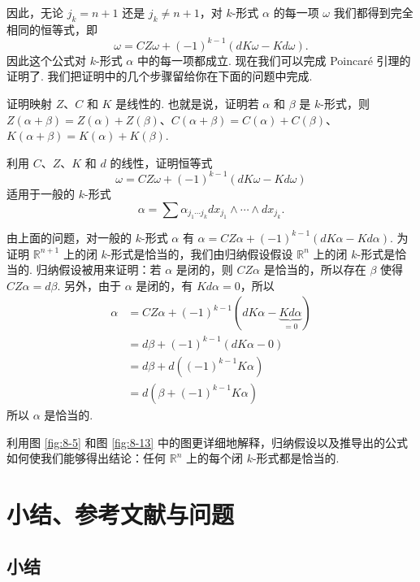 因此，无论 $j_k=n+1$ 还是 $j_k\neq n+1$，对 $k$-形式 $\alpha$ 的每一项 $\omega$ 我们都得到完全相同的恒等式，即
\[
\omega=CZ\omega+(-1)^{k-1}\left(dK\omega-Kd\omega\right).
\]
因此这个公式对 $k$-形式 $\alpha$ 中的每一项都成立. 现在我们可以完成 Poincaré 引理的证明了. 我们把证明中的几个步骤留给你在下面的问题中完成.

\begin{question}\label{q:8-8}
证明映射 $Z$、$C$ 和 $K$ 是线性的. 也就是说，证明若 $\alpha$ 和 $\beta$ 是 $k$-形式，则 $Z(\alpha+\beta)=Z(\alpha)+Z(\beta)$、$C(\alpha+\beta)=C(\alpha)+C(\beta)$、$K(\alpha+\beta)=K(\alpha)+K(\beta)$.
\end{question}

\begin{question}\label{q:8-9}
利用 $C$、$Z$、$K$ 和 $d$ 的线性，证明恒等式
\[
\omega=CZ\omega+(-1)^{k-1}\left(dK\omega-Kd\omega\right)
\]
适用于一般的 $k$-形式
\[
\alpha=\sum\alpha_{j_1\cdots j_k}dx_{j_1}\wedge\cdots\wedge dx_{j_k}.
\]
\end{question}

由上面的问题，对一般的 $k$-形式 $\alpha$ 有 $\alpha=CZ\alpha+(-1)^{k-1}\left(dK\alpha-Kd\alpha\right)$. 为证明 $\mathbb{R}^{n+1}$ 上的闭 $k$-形式是恰当的，我们由归纳假设假设 $\mathbb{R}^n$ 上的闭 $k$-形式是恰当的. 归纳假设被用来证明：若 $\alpha$ 是闭的，则 $CZ\alpha$ 是恰当的，所以存在 $\beta$ 使得 $CZ\alpha=d\beta$. 另外，由于 $\alpha$ 是闭的，有 $Kd\alpha=0$，所以
\[
\begin{aligned}
\alpha &= CZ\alpha+(-1)^{k-1}\left(dK\alpha-\underbrace{Kd\alpha}_{=0}\right)\\
&= d\beta+(-1)^{k-1}\left(dK\alpha-0\right)\\
&= d\beta+d\left((-1)^{k-1}K\alpha\right)\\
&= d\left(\beta+(-1)^{k-1}K\alpha\right)
\end{aligned}
\]
所以 $\alpha$ 是恰当的.

\begin{question}\label{q:8-10}
利用图 \ref{fig:8-5} 和图 \ref{fig:8-13} 中的图更详细地解释，归纳假设以及推导出的公式如何使我们能够得出结论：任何 $\mathbb{R}^n$ 上的每个闭 $k$-形式都是恰当的.
\end{question}

\section{小结、参考文献与问题}

\subsection{小结}

